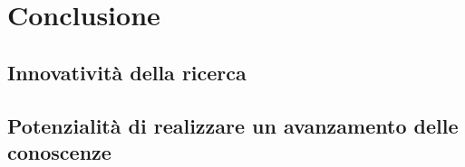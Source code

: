 \chapter{Conclusione}
\section{Innovatività della ricerca}
\section{Potenzialità di realizzare un avanzamento delle conoscenze}
